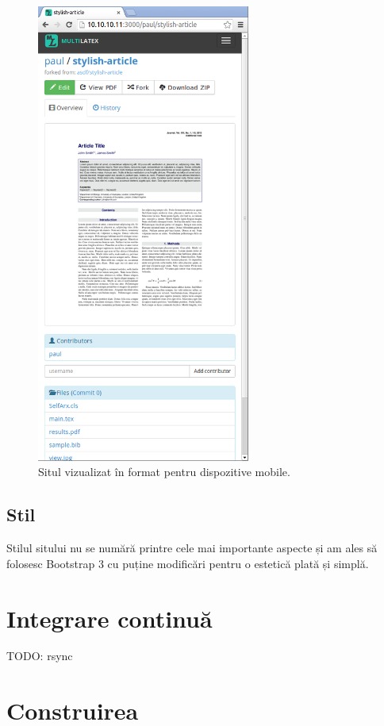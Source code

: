 \documentclass[a4wide,12pt]{report}
\newcommand{\idee}[1]{{\color{red} #1}}
\begin{document}
\begin{figure}
\begin{center}
\includegraphics[width=7cm]{imagini/mobile}
\end{center}
\caption{Situl vizualizat în format pentru dispozitive mobile.}
\label{mobilesitefig}
\end{figure}

\subsection{Stil}

Stilul sitului nu se numără printre cele mai importante aspecte și am ales să
folosesc Bootstrap 3 cu puține modificări pentru o estetică plată și simplă.

\section{Integrare continuă}

\idee{TODO: rsync}

\section{Construirea}
\end{document}
